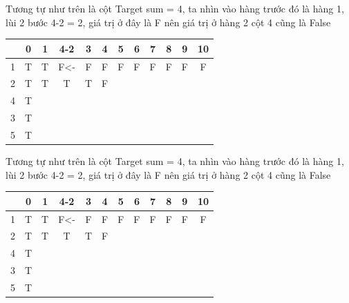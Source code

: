 \documentclass{article}
\begin{document}
    Tương tự như trên là cột Target sum = 4, ta nhìn vào hàng trước đó là hàng 1, lùi 2 bước 4-2 = 2, giá trị ở đây là F nên giá trị ở hàng 2 cột 4 cũng là False\\
    \begin{center}
        \begin{tabular}{|c|c|c|c|c|c|c|c|c|c|c|c|}
        \hline
        {}&{0}&{1}&{4-2}&{3}&{4}&{5}&{6}&{7}&{8}&{9}&{10}\\
        \hline
        1&T&T&F<-&F&F&F&F&F&F&F&F\\
        \hline
        2&T&T&T&T&F&&&&&&\\
        \hline
        4&T&&&&&&&&&&\\
        \hline
        3&T&&&&&&&&&&\\
        \hline
        5&T&&&&&&&&&&\\
        \hline
    \end{tabular}
    \end{center}
    
     Tương tự như trên là cột Target sum = 4, ta nhìn vào hàng trước đó là hàng 1, lùi 2 bước 4-2 = 2, giá trị ở đây là F nên giá trị ở hàng 2 cột 4 cũng là False\\
    \begin{center}
        \begin{tabular}{|c|c|c|c|c|c|c|c|c|c|c|c|}
        \hline
        {}&{0}&{1}&{4-2}&{3}&{4}&{5}&{6}&{7}&{8}&{9}&{10}\\
        \hline
        1&T&T&F<-&F&F&F&F&F&F&F&F\\
        \hline
        2&T&T&T&T&F&&&&&&\\
        \hline
        4&T&&&&&&&&&&\\
        \hline
        3&T&&&&&&&&&&\\
        \hline
        5&T&&&&&&&&&&\\
        \hline
    \end{tabular}
    \end{center}
    
\end{document}
